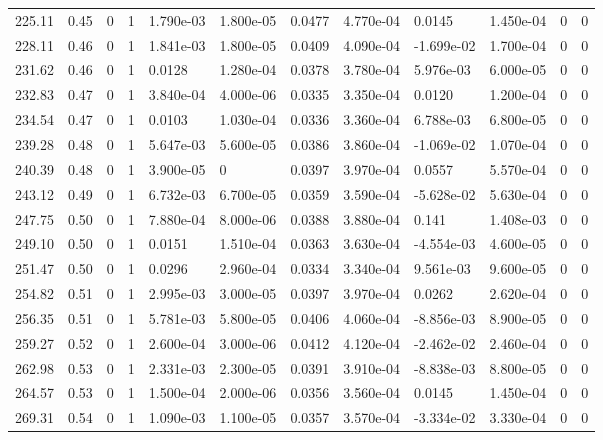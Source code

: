 \documentclass[preview]{standalone}
\begin{document}
{{{{{{{{{{{{{{\begin{tabular}{L{1.2cm}C{1.2cm} C{0.3cm}C{0.5cm} C{1.4cm}C{1.4cm} C{1.4cm}C{1.4cm} C{1.6cm}C{1.6cm} C{1.6cm}C{1.6cm}}
  225.11  &  0.45  & 0     &  1 &  1.790e-03  & 1.800e-05  &  0.0477&   4.770e-04& 0.0145 & 1.450e-04   &  0 & 0  \\ 
  228.11  &  0.46  & 0     &  1 &  1.841e-03  & 1.800e-05  &  0.0409&   4.090e-04& -1.699e-02 & 1.700e-04   &  0 & 0  \\ 
  231.62  &  0.46  & 0     &  1 &  0.0128  & 1.280e-04  &  0.0378&   3.780e-04& 5.976e-03 & 6.000e-05   &  0 & 0  \\ 
  232.83  &  0.47  & 0     &  1 &  3.840e-04  & 4.000e-06  &  0.0335&   3.350e-04& 0.0120 & 1.200e-04   &  0 & 0  \\ 
  234.54  &  0.47  & 0     &  1 &  0.0103  & 1.030e-04  &  0.0336&   3.360e-04& 6.788e-03 & 6.800e-05   &  0 & 0  \\ 
  239.28  &  0.48  & 0     &  1 &  5.647e-03  & 5.600e-05  &  0.0386&   3.860e-04& -1.069e-02 & 1.070e-04   &  0 & 0  \\ 
  240.39  &  0.48  & 0     &  1 &  3.900e-05  & 0  &  0.0397&   3.970e-04& 0.0557 & 5.570e-04   &  0 & 0  \\ 
  243.12  &  0.49  & 0     &  1 &  6.732e-03  & 6.700e-05  &  0.0359&   3.590e-04& -5.628e-02 & 5.630e-04   &  0 & 0  \\ 
  247.75  &  0.50  & 0     &  1 &  7.880e-04  & 8.000e-06  &  0.0388&   3.880e-04& 0.141 & 1.408e-03   &  0 & 0  \\ 
  249.10  &  0.50  & 0     &  1 &  0.0151  & 1.510e-04  &  0.0363&   3.630e-04& -4.554e-03 & 4.600e-05   &  0 & 0  \\ 
  251.47  &  0.50  & 0     &  1 &  0.0296  & 2.960e-04  &  0.0334&   3.340e-04& 9.561e-03 & 9.600e-05   &  0 & 0  \\ 
  254.82  &  0.51  & 0     &  1 &  2.995e-03  & 3.000e-05  &  0.0397&   3.970e-04& 0.0262 & 2.620e-04   &  0 & 0  \\ 
  256.35  &  0.51  & 0     &  1 &  5.781e-03  & 5.800e-05  &  0.0406&   4.060e-04& -8.856e-03 & 8.900e-05   &  0 & 0  \\ 
  259.27  &  0.52  & 0     &  1 &  2.600e-04  & 3.000e-06  &  0.0412&   4.120e-04& -2.462e-02 & 2.460e-04   &  0 & 0  \\ 
  262.98  &  0.53  & 0     &  1 &  2.331e-03  & 2.300e-05  &  0.0391&   3.910e-04& -8.838e-03 & 8.800e-05   &  0 & 0  \\ 
  264.57  &  0.53  & 0     &  1 &  1.500e-04  & 2.000e-06  &  0.0356&   3.560e-04& 0.0145 & 1.450e-04   &  0 & 0  \\ 
  269.31  &  0.54  & 0     &  1 &  1.090e-03  & 1.100e-05  &  0.0357&   3.570e-04& -3.334e-02 & 3.330e-04   &  0 & 0  \\ 

\end{tabular}}}}}}}}}}}}}}}
\end{document}
